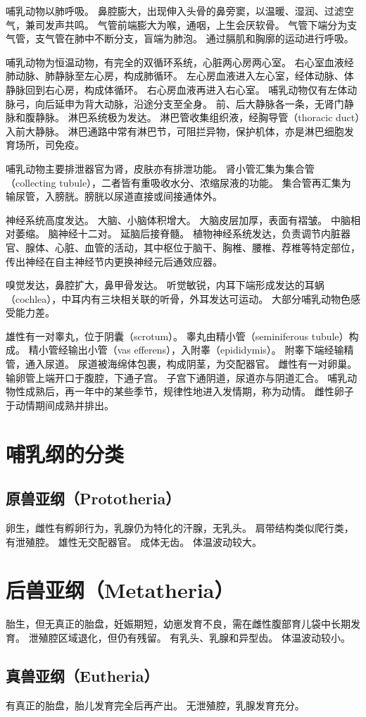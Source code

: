 \documentclass[11pt]{article}
\begin{document}
\newline

哺乳动物以肺呼吸。
鼻腔膨大，出现伸入头骨的鼻旁窦，以温暖、湿润、过滤空气，兼司发声共鸣。
气管前端膨大为喉，通咽，上生会厌软骨。
气管下端分为支气管，支气管在肺中不断分支，盲端为肺泡。
通过膈肌和胸廓的运动进行呼吸。

\newline

哺乳动物为恒温动物，有完全的双循环系统，心脏两心房两心室。
右心室血液经肺动脉、肺静脉至左心房，构成肺循环。
左心房血液进入左心室，经体动脉、体静脉回到右心房，构成体循环。
右心房血液再进入右心室。
哺乳动物仅有左体动脉弓，向后延申为背大动脉，沿途分支至全身。
前、后大静脉各一条，无肾门静脉和腹静脉。
淋巴系统极为发达。
淋巴管收集组织液，经胸导管（thoracic duct）入前大静脉。
淋巴通路中常有淋巴节，可阻拦异物，保护机体，亦是淋巴细胞发育场所，司免疫。

\newline

哺乳动物主要排泄器官为肾，皮肤亦有排泄功能。
肾小管汇集为集合管（collecting tubule），二者皆有重吸收水分、浓缩尿液的功能。
集合管再汇集为输尿管，入膀胱。膀胱以尿道直接或间接通体外。

\newline

神经系统高度发达。
大脑、小脑体积增大。
大脑皮层加厚，表面有褶皱。
中脑相对萎缩。
脑神经十二对。
延脑后接脊髓。
植物神经系统发达，负责调节内脏器官、腺体、心脏、血管的活动，其中枢位于脑干、胸椎、腰椎、荐椎等特定部位，传出神经在自主神经节内更换神经元后通效应器。

\newline

嗅觉发达，鼻腔扩大，鼻甲骨发达。
听觉敏锐，内耳下端形成发达的耳蜗（cochlea），中耳内有三块相关联的听骨，外耳发达可运动。
大部分哺乳动物色感受能力差。

\newline

雄性有一对睾丸，位于阴囊（scrotum）。
睾丸由精小管（seminiferous tubule）构成。
精小管经输出小管（vas efferens），入附睾（epididymis）。
附睾下端经输精管，通入尿道。
尿道被海绵体包裹，构成阴茎，为交配器官。
雌性有一对卵巢。输卵管上端开口于腹腔，下通子宫。
子宫下通阴道，尿道亦与阴道汇合。
哺乳动物性成熟后，再一年中的某些季节，规律性地进入发情期，称为动情。
雌性卵子于动情期间成熟并排出。

\section{哺乳纲的分类}
\subsection{原兽亚纲（Prototheria）}
卵生，雌性有孵卵行为，乳腺仍为特化的汗腺，无乳头。
肩带结构类似爬行类，有泄殖腔。
雄性无交配器官。
成体无齿。
体温波动较大。

\section{后兽亚纲（Metatheria）}
胎生，但无真正的胎盘，妊娠期短，幼崽发育不良，需在雌性腹部育儿袋中长期发育。
泄殖腔区域退化，但仍有残留。
有乳头、乳腺和异型齿。
体温波动较小。

\subsection{真兽亚纲（Eutheria）}
有真正的胎盘，胎儿发育完全后再产出。
无泄殖腔，乳腺发育充分。
  
\end{document}
